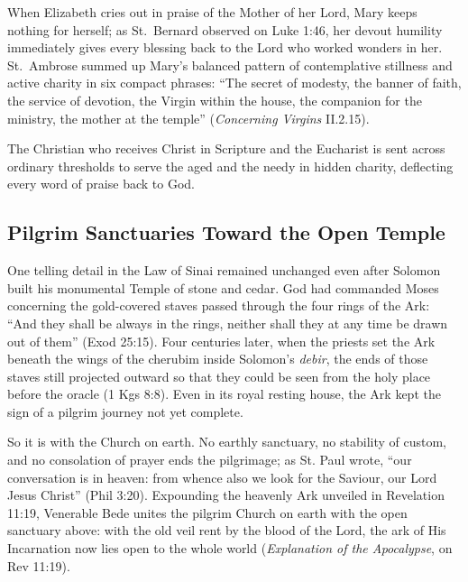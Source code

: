 When Elizabeth cries out in praise of the Mother of her Lord, Mary keeps nothing for herself; as St.\ Bernard observed on Luke 1:46, her devout humility immediately gives every blessing back to the Lord who worked wonders in her. St.\ Ambrose summed up Mary's balanced pattern of contemplative stillness and active charity in six compact phrases: ``The secret of modesty, the banner of faith, the service of devotion, the Virgin within the house, the companion for the ministry, the mother at the temple'' (\textit{Concerning Virgins} II.2.15).

The Christian who receives Christ in Scripture and the Eucharist is sent across ordinary thresholds to serve the aged and the needy in hidden charity, deflecting every word of praise back to God.

\subsection{Pilgrim Sanctuaries Toward the Open Temple}\label{subsec:pilgrim-sanctuaries}

One telling detail in the Law of Sinai remained unchanged even after Solomon built his monumental Temple of stone and cedar. God had commanded Moses concerning the gold-covered staves passed through the four rings of the Ark: ``And they shall be always in the rings, neither shall they at any time be drawn out of them'' (Exod 25:15). Four centuries later, when the priests set the Ark beneath the wings of the cherubim inside Solomon's \textit{debir}, the ends of those staves still projected outward so that they could be seen from the holy place before the oracle (1 Kgs 8:8). Even in its royal resting house, the Ark kept the sign of a pilgrim journey not yet complete.

So it is with the Church on earth. No earthly sanctuary, no stability of custom, and no consolation of prayer ends the pilgrimage; as St. Paul wrote, ``our conversation is in heaven: from whence also we look for the Saviour, our Lord Jesus Christ'' (Phil 3:20). Expounding the heavenly Ark unveiled in Revelation 11:19, Venerable Bede unites the pilgrim Church on earth with the open sanctuary above: with the old veil rent by the blood of the Lord, the ark of His Incarnation now lies open to the whole world (\textit{Explanation of the Apocalypse}, on Rev 11:19).

